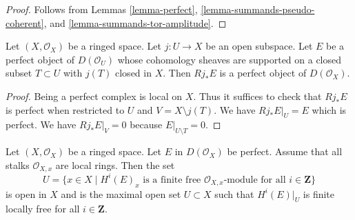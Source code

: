 \begin{proof}
Follows from
Lemmas \ref{lemma-perfect}, \ref{lemma-summands-pseudo-coherent}, and
\ref{lemma-summands-tor-amplitude}.
\end{proof}

\begin{lemma}
\label{lemma-pushforward-perfect}
Let $(X, \mathcal{O}_X)$ be a ringed space. Let $j : U \to X$ be an
open subspace. Let $E$ be a perfect object of $D(\mathcal{O}_U)$
whose cohomology
sheaves are supported on a closed subset $T \subset U$ with $j(T)$
closed in $X$. Then $Rj_*E$ is a perfect object of $D(\mathcal{O}_X)$.
\end{lemma}

\begin{proof}
Being a perfect complex is local on $X$. Thus it suffices to check that
$Rj_*E$ is perfect when restricted to $U$ and $V = X \setminus j(T)$.
We have $Rj_*E|_U = E$ which is perfect. We have
 $Rj_*E|_V = 0$ because $E|_{U \setminus T} = 0$.
\end{proof}

\begin{lemma}
\label{lemma-perfect-max-open-coh-loc-free}
Let $(X, \mathcal{O}_X)$ be a ringed space. Let $E$ in $D(\mathcal{O}_X)$
be perfect. Assume that all stalks $\mathcal{O}_{X, x}$ are local rings.
Then the set
$$
U =
\{x \in X \mid
H^i(E)_x\text{ is a finite free }
\mathcal{O}_{X, x}\text{-module for all }i\in \mathbf{Z}\}
$$
is open in $X$ and is the maximal open set $U \subset X$ such that
$H^i(E)|_U$ is finite locally free for all $i \in \mathbf{Z}$.
\end{lemma}

